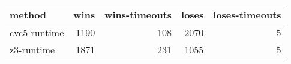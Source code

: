\begin{tabular}{lrrrr}
\hline
 method       &   wins &   wins-timeouts &   loses &   loses-timeouts \\
\hline
 cvc5-runtime &   1190 &             108 &    2070 &                5 \\
 z3-runtime   &   1871 &             231 &    1055 &                5 \\
\hline
\end{tabular}
